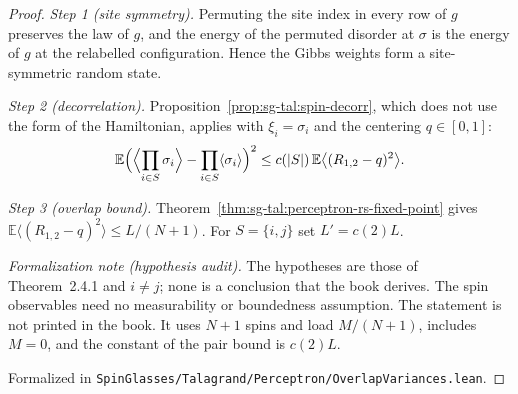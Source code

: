 \begin{proof}
\leanok
\emph{Step 1 (site symmetry).} Permuting the site index in every row of $g$ preserves the law of $g$, and the
energy of the permuted disorder at $\sigma$ is the energy of $g$ at the relabelled configuration. Hence the
Gibbs weights form a site-symmetric random state.

\emph{Step 2 (decorrelation).} Proposition~\ref{prop:sg-tal:spin-decorr}, which does not use the form of the
Hamiltonian, applies with $\xi_i=\sigma_i$ and the centering $q\in[0,1]$:
\[
 \mathbb E\Bigl(\Bigl\langle\prod_{i\in S}\sigma_i\Bigr\rangle-\prod_{i\in S}\langle\sigma_i\rangle\Bigr)^2
 \le c(|S|)\,\mathbb E\bigl\langle(R_{1,2}-q)^2\bigr\rangle .
\]

\emph{Step 3 (overlap bound).} Theorem~\ref{thm:sg-tal:perceptron-rs-fixed-point} gives
$\mathbb E\langle(R_{1,2}-q)^2\rangle\le L/(N+1)$. For $S=\{i,j\}$ set $L'=c(2)L$.

\emph{Formalization note (hypothesis audit).} The hypotheses are those of Theorem~2.4.1 and $i\ne j$; none is a
conclusion that the book derives. The spin observables need no measurability or boundedness assumption. The
statement is not printed in the book. It uses $N+1$ spins and load $M/(N+1)$, includes $M=0$, and the constant of
the pair bound is $c(2)L$.

Formalized in \texttt{SpinGlasses/Talagrand/Perceptron/OverlapVariances.lean}.
\end{proof}

